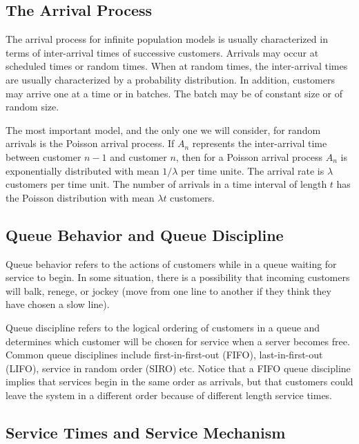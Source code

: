 \documentclass[
]{book}
\begin{document}
\hypertarget{the-arrival-process}{%
\subsection{The Arrival Process}\label{the-arrival-process}}

The arrival process for infinite population models is usually characterized in terms of inter-arrival times of successive customers. Arrivals may occur at scheduled times or random times. When at random times, the inter-arrival times are usually characterized by a probability distribution. In addition, customers may arrive one at a time or in batches. The batch may be of constant size or of random size.

The most important model, and the only one we will consider, for random arrivals is the Poisson arrival process. If \(A_n\) represents the inter-arrival time between customer \(n-1\) and customer \(n\), then for a Poisson arrival process \(A_n\) is exponentially distributed with mean \(1/\lambda\) per time unite. The arrival rate is \(\lambda\) customers per time unit. The number of arrivals in a time interval of length \(t\) has the Poisson distribution with mean \(\lambda t\) customers.

\hypertarget{queue-behavior-and-queue-discipline}{%
\subsection{Queue Behavior and Queue Discipline}\label{queue-behavior-and-queue-discipline}}

Queue behavior refers to the actions of customers while in a queue waiting for service to begin. In some situation, there is a possibility that incoming customers will balk, renege, or jockey (move from one line to another if they think they have chosen a slow line).

Queue discipline refers to the logical ordering of customers in a queue and determines which customer will be chosen for service when a server becomes free. Common queue disciplines include first-in-first-out (FIFO), last-in-first-out (LIFO), service in random order (SIRO) etc. Notice that a FIFO queue discipline implies that services begin in the same order as arrivals, but that customers could leave the system in a different order because of different length service times.

\hypertarget{service-times-and-service-mechanism}{%
\subsection{Service Times and Service Mechanism}\label{service-times-and-service-mechanism}}
\end{document}
